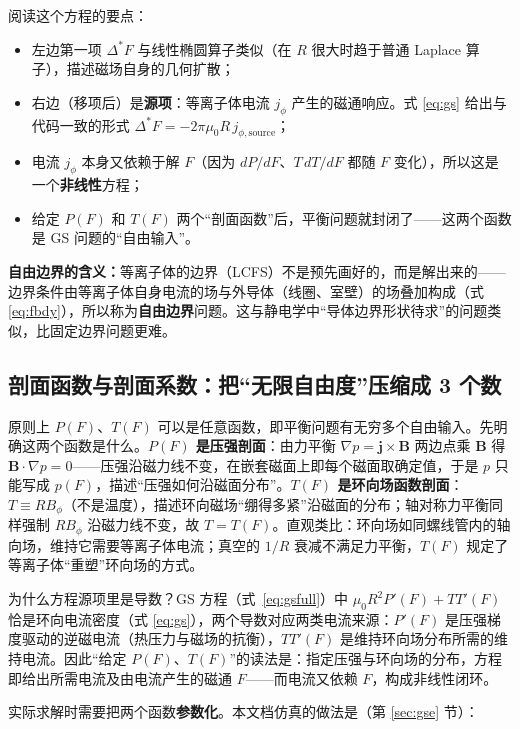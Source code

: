 \documentclass[12pt,fontset=none]{ctexart}
\numberwithin{equation}{section}
\numberwithin{table}{section}
\numberwithin{figure}{section}
\begin{document}
阅读这个方程的要点：

\begin{itemize}[nosep]
  \item 左边第一项 $\Delta^*F$ 与线性椭圆算子类似（在 $R$ 很大时趋于普通 Laplace 算子），描述磁场自身的几何扩散；
  \item 右边（移项后）是\textbf{源项}：等离子体电流 $j_\phi$ 产生的磁通响应。式 \eqref{eq:gs} 给出与代码一致的形式 $\Delta^*F=-2\pi\mu_0R\,j_{\phi,\mathrm{source}}$；
  \item 电流 $j_\phi$ 本身又依赖于解 $F$（因为 $dP/dF$、$T\,dT/dF$ 都随 $F$ 变化），所以这是一个\textbf{非线性}方程；
  \item 给定 $P(F)$ 和 $T(F)$ 两个``剖面函数''后，平衡问题就封闭了——这两个函数是 GS 问题的``自由输入''。
\end{itemize}

\textbf{自由边界的含义：}等离子体的边界（LCFS）不是预先画好的，而是解出来的——边界条件由等离子体自身电流的场与外导体（线圈、室壁）的场叠加构成（式 \eqref{eq:fbdy}），所以称为\textbf{自由边界}问题。这与静电学中``导体边界形状待求''的问题类似，比固定边界问题更难。

\subsection{剖面函数与剖面系数：把``无限自由度''压缩成 3 个数}\label{sec:primer-profiles}

原则上 $P(F)$、$T(F)$ 可以是任意函数，即平衡问题有无穷多个自由输入。先明确这两个函数是什么。\textbf{$P(F)$ 是压强剖面}：由力平衡 $\nabla p=\bm{j}\times\bm{B}$ 两边点乘 $\bm{B}$ 得 $\bm{B}\cdot\nabla p=0$——压强沿磁力线不变，在嵌套磁面上即每个磁面取确定值，于是 $p$ 只能写成 $p(F)$，描述``压强如何沿磁面分布''。\textbf{$T(F)$ 是环向场函数剖面}：$T\equiv RB_\phi$（不是温度），描述环向磁场``绷得多紧''沿磁面的分布；轴对称力平衡同样强制 $RB_\phi$ 沿磁力线不变，故 $T=T(F)$。直观类比：环向场如同螺线管内的轴向场，维持它需要等离子体电流；真空的 $1/R$ 衰减不满足力平衡，$T(F)$ 规定了等离子体``重塑''环向场的方式。

为什么方程源项里是导数？GS 方程（式~\eqref{eq:gsfull}）中 $\mu_0R^2P'(F)+TT'(F)$ 恰是环向电流密度（式 \eqref{eq:gs}），两个导数对应两类电流来源：$P'(F)$ 是压强梯度驱动的逆磁电流（热压力与磁场的抗衡），$TT'(F)$ 是维持环向场分布所需的维持电流。因此``给定 $P(F)$、$T(F)$''的读法是：指定压强与环向场的分布，方程即给出所需电流及由电流产生的磁通 $F$——而电流又依赖 $F$，构成非线性闭环。

实际求解时需要把两个函数\textbf{参数化}。本文档仿真的做法是（第 \ref{sec:gse} 节）：
\end{document}
